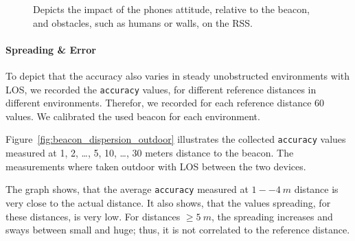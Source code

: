 \begin{figure}
\caption {Depicts the impact of the phones attitude, relative to the beacon, and obstacles, such as humans or walls, on the \acs{RSS}.} %
\label{fig:beacon_eval_situations}
\end{figure}


\paragraph{Spreading \& Error} To depict that the accuracy also varies in steady unobstructed environments with \acs{LOS}, we recorded the \texttt{accuracy} values, for different reference distances in different environments. Therefor, we recorded for each reference distance 60 values. We calibrated the used beacon for each environment.

Figure~\ref{fig:beacon_dispersion_outdoor} illustrates the collected \texttt{accuracy} values measured at 1, 2, \ldots, 5, 10, \ldots, 30 meters distance to the beacon. The measurements where taken outdoor with \acl{LOS} between the two devices.

The graph shows, that the average \texttt{accuracy} measured at $1--4~m$ distance is very close to the actual distance. It also shows, that the values spreading, for these distances, is very low. For distances $\geq 5~m$, the spreading increases and sways between small and huge; thus, it is not correlated to the reference distance. 

